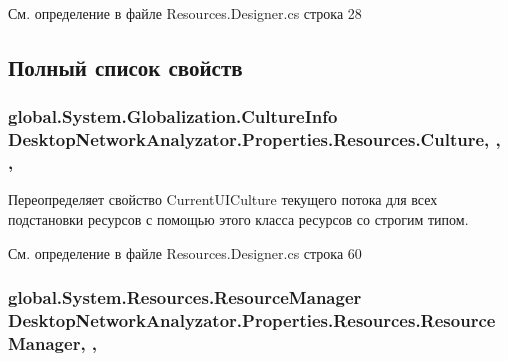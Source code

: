 См. определение в файле Resources.\+Designer.\+cs строка 28



\subsection{Полный список свойств}
\subsubsection[{\texorpdfstring{Culture}{Culture}}]{\setlength{\rightskip}{0pt plus 5cm}global.\+System.\+Globalization.\+Culture\+Info Desktop\+Network\+Analyzator.\+Properties.\+Resources.\+Culture\hspace{0.3cm}{\ttfamily [static]}, {\ttfamily [get]}, {\ttfamily [set]}, {\ttfamily [package]}}\hypertarget{class_desktop_network_analyzator_1_1_properties_1_1_resources_a0ffd2cedfddbff03a1e4d2d7b7cb42bd}{}\label{class_desktop_network_analyzator_1_1_properties_1_1_resources_a0ffd2cedfddbff03a1e4d2d7b7cb42bd}


Переопределяет свойство Current\+U\+I\+Culture текущего потока для всех подстановки ресурсов с помощью этого класса ресурсов со строгим типом. 



См. определение в файле Resources.\+Designer.\+cs строка 60

\subsubsection[{\texorpdfstring{Resource\+Manager}{ResourceManager}}]{\setlength{\rightskip}{0pt plus 5cm}global.\+System.\+Resources.\+Resource\+Manager Desktop\+Network\+Analyzator.\+Properties.\+Resources.\+Resource\+Manager\hspace{0.3cm}{\ttfamily [static]}, {\ttfamily [get]}, {\ttfamily [package]}}\hypertarget{class_desktop_network_analyzator_1_1_properties_1_1_resources_ae5276cdc8e040a7502e987df90a0461f}{}\label{class_desktop_network_analyzator_1_1_properties_1_1_resources_ae5276cdc8e040a7502e987df90a0461f}


